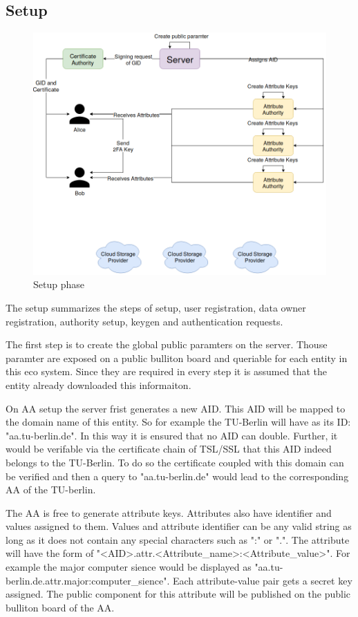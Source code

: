 \subsection{Setup}
\begin{figure}[!ht]
\centering
    \includegraphics[width=\linewidth]{img/TF-DAC-MACS-overview-setup.png}
    \caption{Setup phase}
    \label{fig:tfdacmacs-setup}
\end{figure}

The setup summarizes the steps of \cite{li2017two} setup, user registration, data owner registration, authority setup, keygen and authentication requests. 

The first step is to create the global public paramters on the server. Thouse paramter are exposed on a public bulliton board and queriable for each entity in this eco system. Since they are required in every step it is assumed that the entity already downloaded this informaiton. 

On AA setup the server frist generates a new AID. This AID will be mapped to the domain name of this entity. So for example the TU-Berlin will have as its ID: "aa.tu-berlin.de". In this way it is ensured that no AID can double. Further, it would be verifable via the certificate chain of TSL/SSL that this AID indeed belongs to the TU-Berlin. To do so the certificate coupled with this domain can be verified and then a query to "aa.tu-berlin.de" would lead to the corresponding AA of the TU-berlin.

The AA is free to generate attribute keys. Attributes also have identifier and values assigned to them. Values and attribute identifier can be any valid string as long as it does not contain any special characters such as ":" or ".". The attribute will have the form of "<AID>.attr.<Attribute\_name>:<Attribute\_value>". For example the major computer sience would be displayed as "aa.tu-berlin.de.attr.major:computer\_sience". Each attribute-value pair gets a secret key assigned. The public component for this attribute will be published on the public bulliton board of the AA. 

